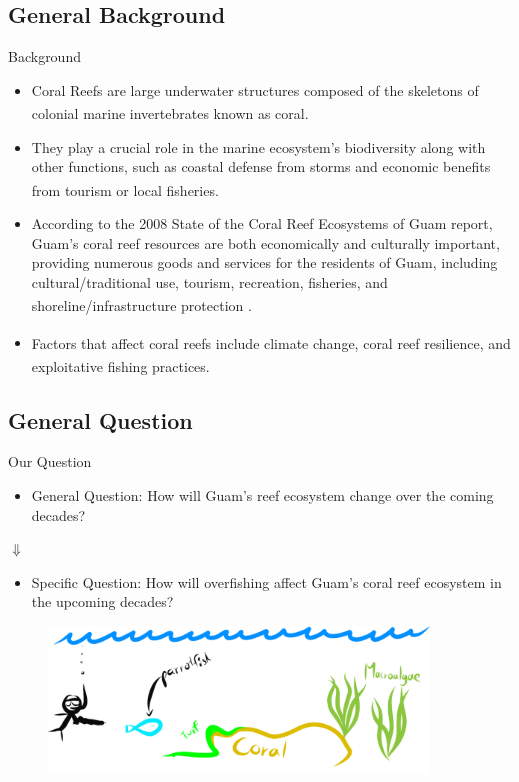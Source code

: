 \documentclass{beamer}
\begin{document}
\subsection{General Background}
\begin{frame}{Background}
    \begin{itemize}
        \item<1-> Coral Reefs are large underwater structures composed of the skeletons of colonial marine invertebrates known as coral\textsuperscript{\cite{ross}}.
         \item<2-> They play a crucial role in the marine ecosystem's biodiversity along with other functions, such as coastal defense from storms and economic benefits from tourism or local fisheries\textsuperscript{\cite{04_mathanalysis}}.
         \item<3-> According to the 2008 State of the Coral Reef Ecosystems of Guam report, Guam’s coral reef resources are both economically and culturally important, providing numerous goods and services for the residents of Guam, including cultural/traditional use, tourism, recreation, fisheries, and shoreline/infrastructure protection \textsuperscript{\cite{guamwebsite}}.
         \item<4-> Factors that affect coral reefs include climate change, coral reef resilience\textsuperscript{\cite{02_Riegl_Purkis_Model}}, and exploitative fishing practices\textsuperscript{\cite{05_quintero_machuca_cotto_bradley_ríos-soto_2016}}.
    \end{itemize}
\end{frame}

\subsection{General Question}
\begin{frame}{Our Question}
\begin{itemize}
    \item General Question: How will Guam's reef ecosystem change over the coming decades?
\end{itemize}
\begin{center}
    $\Downarrow$
\end{center}
\begin{itemize}
    \item Specific Question: How will overfishing affect Guam's coral reef ecosystem in the upcoming decades?
\end{itemize}
\begin{figure}
    \centering
    \includegraphics[width=0.9\textwidth]{Latex/Figures/figure1.png}
\end{figure}
\end{frame}
\end{document}
